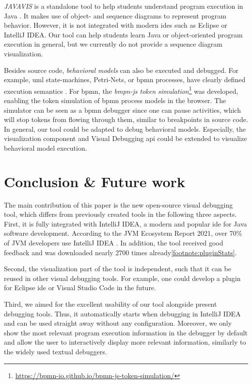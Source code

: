 \documentclass[conference]{IEEEtran}
\newcommand{\intellij}{IntelliJ IDEA}
\begin{document}
\textit{JAVAVIS} is a standalone tool to help students understand program execution in Java \cite{oechsleJAVAVISAutomaticProgram2002}.
It makes use of object- and sequence diagrams to represent program behavior.
However, it is not integrated with modern \glspl*{ide} such as Eclipse or \intellij{}.
Our tool can help students learn Java or object-oriented program execution in general, but we currently do not provide a sequence diagram visualization.

Besides source code, \textit{behavioral models} can also be executed and debugged.
For example, \gls*{uml} state-machines, Petri-Nets, or \gls*{bpmn} processes, have clearly defined execution semantics \cite{objectmanagementgroupUnifiedModelingLanguage2017, objectmanagementgroupBusinessProcessModel2013}.
For \gls*{bpmn}, the \textit{bmpn-js token simulation}\footnote{\url{https://bpmn-io.github.io/bpmn-js-token-simulation/}} was developed, enabling the token simulation of \gls*{bpmn} process models in the browser.
The simulator can be seen as a \gls*{bpmn} debugger since one can pause activities, which will stop tokens from flowing through them, similar to breakpoints in source code.
In general, our tool could be adapted to debug behavioral models.
Especially, the visualization component and Visual Debugging \gls*{api} could be extended to visualize behavioral model execution.

\section{Conclusion \& Future work} \label{sec:conclusion}
The main contribution of this paper is the new open-source visual debugging tool, which differs from previously created tools in the following three aspects.
First, it is fully integrated with \intellij{}, a modern and popular \gls*{ide} for Java software development.
According to the JVM Ecosystem Report 2021, over 70\% of JVM developers use \intellij{}  \cite{JVMEcosystemReport2021}.
In addition, the tool received good feedback and was downloaded nearly 2700 times already\cref{footnote:pluginStats}.

Second, the visualization part of the tool is independent, such that it can be reused in other visual debugging tools.
For example, one could develop a plugin for Eclipse \gls*{ide} or Visual Studio Code in the future.

Third, we aimed for the excellent usability of our tool alongside present debugging tools.
Thus, it automatically starts when debugging in \intellij{} and can be used straight away without any configuration.
Moreover, we only show the most relevant program execution information in the debugger by default and allow the user to interactively display more relevant information, similarly to the widely used textual debuggers.
\end{document}
